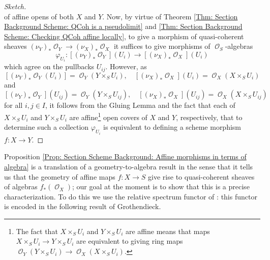 \documentclass{amsart}
\theoremstyle{definition}
\DeclareMathOperator{\Ocal}{\mathcal{O}}
\numberwithin{equation}{subsection}
\begin{document}
\begin{proof}[Sketch]
\[\]
of affine opens of both $X$ and $Y$. Now, by virtue of Theorem \ref{Thm: Section Background Scheme: QCoh is a pseudolimit} and \ref{Thm: Section Background Scheme: Checking QCoh affine locally}, to give a morphism of quasi-coherent sheaves $(\nu_Y)_{\ast}\Ocal_Y \to (\nu_X)_{\ast}\Ocal_X$ it suffices to give morphisms of $\Ocal_S$-algebras
\[
\varphi_{U_i}:\left[(\nu_Y)_{\ast}\Ocal_Y\right](U_i) \longrightarrow \left[(\nu_X)_{\ast}\Ocal_X\right](U_i)
\]
which agree on the pullbacks $U_{ij}$. However, as
\[
\left[(\nu_Y)_{\ast}\Ocal_Y(U_i)\right] = \Ocal_Y(Y \times_S U_i),\quad \left[(\nu_X)_{\ast}\Ocal_X\right](U_i) = \Ocal_X(X\times_S U_i)
\]
and
\[
\left[(\nu_Y)_{\ast}\Ocal_Y\right](U_{ij}) = \Ocal_Y(Y \times_S U_{ij}),\quad \left[(\nu_X)_{\ast}\Ocal_X\right](U_{ij}) = \Ocal_X(X \times_S U_{ij})
\]
for all $i, j \in I$, it follows from the Gluing Lemma and the fact that each of $X \times_S U_i$ and $Y \times_S U_i$ are affine\footnote{The fact that $X \times_S U_i$ and $Y \times_S U_i$ are affine means that maps $X \times_S U_i \to Y \times_S U_i$ are equivalent to giving ring maps $\Ocal_{Y}(Y \times_S U_i) \to \Ocal_X(X \times_S U_i)$.} open covers of $X$ and $Y$, respectively, that to determine such a collection $\varphi_{U_i}$ is equivalent to defining a scheme morphism $f:X \to Y$.
\end{proof}

Proposition \ref{Prop: Section Scheme Background: Affine morphisms in terms of algebra} is a translation of a geometry-to-algebra result in the sense that it tells us that the geometry of affine maps $f:X \to S$ give rise to quasi-coherent sheaves of algebras $f_{\ast}(\Ocal_X)$; our goal at the moment is to show that this is a precise characterization. To do this we use the relative spectrum functor of \cite{EGA2}: this functor is encoded in the following result of Grothendieck.
\end{document}
